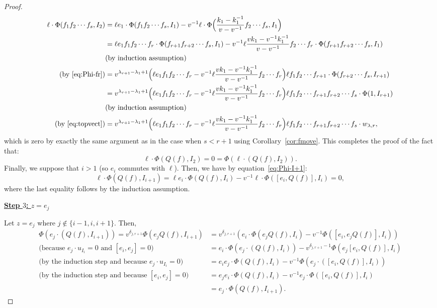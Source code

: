 \documentclass{amsart}
\numberwithin{equation}{section}
\theoremstyle{theorem}
\theoremstyle{definition}
\begin{document}
\begin{proof}
\begin{align*}
\ell\cdot\Phi(f_1f_2\cdots f_s,I_{2})&=\ell e_1\cdot \Phi(f_1f_2\cdots f_s, I_1)-v^{-1}\ell\cdot\Phi\Big(\frac{k_1-k_1^{-1}}{v-v^{-1}}f_2\cdots f_s, I_{1}\Big)\\
&=\ell e_1f_1f_2\cdots f_r\cdot \Phi(f_{r+1}f_{r+2}\cdots f_s, I_1)-v^{-1}\ell\frac{vk_1-v^{-1}k_1^{-1}}{v-v^{-1}}f_2\cdots f_r\cdot \Phi(f_{r+1}f_{r+2}\cdots f_s, I_{1})\\
&\text{(by induction assumption)}\\
\text{(by~\eqref{eq:Phi-fr})}&=v^{\lambda_{r+1}-\lambda_1+1}\Big(\ell e_1f_1f_2\cdots f_r-v^{-1}\ell\frac{vk_1-v^{-1}k_1^{-1}}{v-v^{-1}}f_2\cdots f_r\Big)\ell f_1f_2\cdots f_{r+1} \cdot\Phi(f_{r+2}\cdots f_s, I_{r+1})\\
&=v^{\lambda_{r+1}-\lambda_1+1}\Big(\ell e_1f_1f_2\cdots f_r-v^{-1}\ell\frac{vk_1-v^{-1}k_1^{-1}}{v-v^{-1}}f_2\cdots f_r\Big)\ell f_1f_2\cdots f_{r+1}f_{r+2}\cdots f_s \cdot\Phi(1, I_{r+1})\\
&\text{(by induction assumption)}\\
\text{(by~\eqref{eq:topvect})}&=v^{\lambda_{r+1}-\lambda_1+1}\Big(\ell e_1f_1f_2\cdots f_r-v^{-1}\ell\frac{vk_1-v^{-1}k_1^{-1}}{v-v^{-1}}f_2\cdots f_r\Big)\ell f_1f_2\cdots f_{r+1}f_{r+2}\cdots f_s \cdot w_{\lambda, r},
\end{align*}
which is zero by exactly the same argument as in the case when $s<r+1$ using Corollary~\ref{cor:fmove}. This completes the proof of the fact that:
\begin{equation} \label{eq:ell20}\ell\cdot \Phi(Q(f), I_2) = 0 = \Phi(\ell\cdot (Q(f), I_2)).\end{equation}
Finally, we suppose that $i>1$ (so $e_i$ commutes with $\ell$). Then, we have by equation~\eqref{eq:Phi-I+1}:
\[\ell \cdot \Phi(Q(f),I_{i+1})=\ell e_i\cdot \Phi( Q(f), I_i)-v^{-1}\ell\cdot \Phi([e_i,Q(f)], I_{i})=0,\]
where the last equality follows by the induction assumption.

\underline{\textbf{Step $3$: $z=e_j$}}

Let $z=e_j$ where $j\not\in\{i-1,i,i+1\}$. Then, 
\begin{align*}\Phi( e_j\cdot(Q(f),I_{i+1}))=v^{\delta_{j,r+1}}\Phi( e_jQ(f),I_{i+1})&=v^{\delta_{j,r+1}}(e_i\cdot \Phi( e_jQ(f), I_i)-v^{-1}\Phi([e_i,e_jQ(f)], I_{i}))\\
\text{(because $e_j\cdot u_{I_i}=0$ and $[e_i,e_j]=0$) }&=e_i\cdot \Phi(e_j\cdot(Q(f), I_i))-v^{\delta_{j,r+1}-1}\Phi(e_j[e_i,Q(f)], I_{i})\\
\text{(by the induction step and because $e_j\cdot u_{I_i}=0$) }&=e_ie_j\cdot \Phi(Q(f), I_i)-v^{-1}\Phi(e_j\cdot([e_i,Q(f)], I_{i}))\\
\text{(by the induction step and because $[e_i,e_j]=0$) }&=e_je_i\cdot \Phi(Q(f), I_i)-v^{-1}e_j\cdot\Phi([e_i,Q(f)], I_{i}) \\
&=  e_j\cdot\Phi(Q(f),I_{i+1}).\end{align*}


\end{proof}
\end{document}
